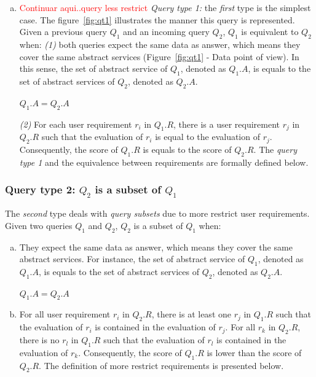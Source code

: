 \begin{enumerate}[b)]
\item \textcolor{red}{Continuar aqui..query less restrict} \textit{Query type 1:} the \textit{first} type is the simplest case. The figure~\ref{fig:qt1} illustrates the manner this query is represented. Given a previous query $Q_{1}$ and an incoming query $Q_{2}$, $Q_{1}$ is equivalent to $Q_{2}$ when: \textit{(1)} both queries expect the same data as answer, which means they cover the same abstract services (Figure~\ref{fig:qt1} - Data point of view). In this sense, the set of abstract service of $Q_{1}$, denoted as $Q_{1}.A$, is equals to the set of abstract services of $Q_{2}$, denoted as $Q_{2}.A$.
%
\begin{center}
$Q_{1}.A = Q_{2}.A$
\end{center}
%
\textit{(2)} For each user requirement $r_{i}$ in $Q_{1}.R$, there is a user requirement $r_{j}$ in $Q_{2}.R$ such that the evaluation of $r_{i}$ is equal to the evaluation of $r_{j}$. 
Consequently, the score of $Q_{1}.R$ is equals to the score of $Q_{2}.R$. The \textit{query type 1} and the equivalence between requirements are formally defined below.
\end{enumerate}


\subsubsection{Query type 2: $Q_{2}$ is a subset of $Q_{1}$}

The \textit{second} type deals with \textit{query subsets} due to more restrict user requirements. Given two queries $Q_{1}$ and $Q_{2}$, $Q_{2}$ is a subset of $Q_{1}$ when:
%
\begin{enumerate}[a)]
\item They expect the same data as answer, which means they cover the same abstract services. 
For instance, the set of abstract service of $Q_{1}$, denoted as $Q_{1}.A$, is equals to the set of abstract services of $Q_{2}$, denoted as $Q_{2}.A$.
%
\begin{center}
$Q_{1}.A = Q_{2}.A$
\end{center}
%
\item For all user requirement $r_{i}$ in $Q_{2}.R$, there is at least one $r_{j}$ in $Q_{1}.R$ such that the evaluation of $r_{i}$ is contained in the evaluation of $r_{j}$. 
For all $r_{k}$ in $Q_{2}.R$, there is no $r_{l}$ in $Q_{1}.R$ such that the evaluation of $r_{l}$ is contained in the evaluation of $r_{k}$. 
Consequently, the score of $Q_{1}.R$ is lower than the score of $Q_{2}.R$. The definition of more restrict requirements is presented below.
\end{enumerate}

